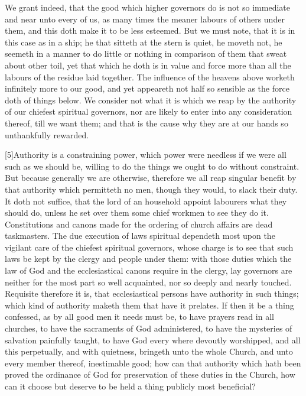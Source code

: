 We grant indeed, that the good which higher governors do is not so immediate and near unto every of us, as many times the meaner labours of others under them, and this doth make it to be less esteemed. But we must note, that it is  in this case as in a ship; he that sitteth at the stern is quiet, he moveth not, he seemeth in a manner to do little or nothing in comparison of them that sweat about other toil, yet that which he doth is in value and force more than all the labours of the residue laid together. The influence of the heavens above worketh infinitely more to our good, and yet appeareth not half so sensible as the force doth of things below. We consider not what it is which we reap by the authority of our chiefest spiritual governors, nor are likely to enter into any consideration thereof, till we want them; and that is the cause why they are at our hands so unthankfully rewarded.

[5]Authority is a constraining power, which power were needless if we were all such as we should be, willing to do the things we ought to do without constraint. But because generally we are otherwise, therefore we all reap singular benefit by that authority which permitteth no men, though they would, to slack their duty. It doth not suffice, that the lord of an household appoint labourers what they should do, unless he set over them some chief workmen to see they do it. Constitutions and canons made for the ordering of church affairs are dead taskmasters. The due execution of laws spiritual dependeth most upon the vigilant care of the chiefest spiritual governors, whose charge is to see that such laws be kept by the clergy and people under them: with those duties which the law of God and the ecclesiastical canons require in the clergy, lay governors are neither for the most part so well acquainted, nor so deeply and nearly touched. Requisite therefore it is, that ecclesiastical persons have authority in such things; which kind of authority maketh them that have it prelates. If then it be a thing confessed, as by all good men it needs must be, to have prayers read in all churches, to have the sacraments of God administered, to have the mysteries of salvation painfully taught, to have God every where devoutly worshipped, and all this perpetually, and with quietness, bringeth unto the whole Church, and unto every member thereof, inestimable good; how can that authority which hath been proved the ordinance of God for preservation of these duties in the Church, how can it choose but deserve to be held a thing publicly most beneficial?


